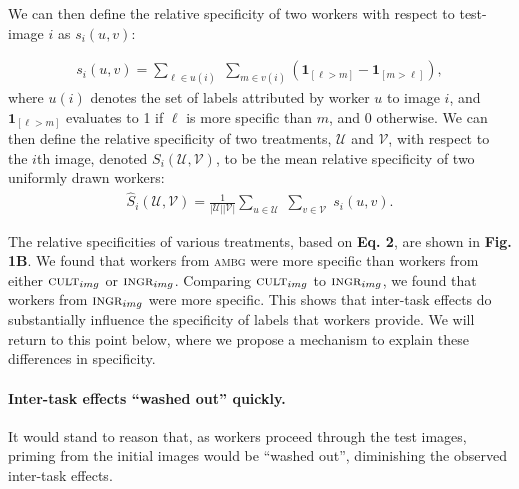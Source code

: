 \documentclass[letterpaper]{article}
\begin{document}
We can then define the relative specificity of two workers with respect to 
test-image $i$ as $s_i(u,v)$:

\begin{align}
	s_i(u,v) = \sum_{\ell \in u(i) } \;
	\sum_{m \in v(i)} 
	\left(\mathbf{1}_{[\ell > m]} - \mathbf{1}_{[m>\ell]}\right),
	\label{eq:worker-specificity}
\end{align}
where $u(i)$ denotes the set of labels attributed by worker $u$ to image $i$, 
and $\mathbf{1}_{[\ell > m]}$ evaluates to 1 if $\ell$ is more specific than 
$m$, and 0 otherwise.
We can then define the relative specificity of two treatments, $\mathcal{U}$ 
and $\mathcal{V}$, with respect to the $i$th image, denoted $S_i(\mathcal{U},\mathcal{V})$, 
to be the mean relative specificity of two uniformly drawn workers:  
\begin{align}
	\hat{S}_i(\mathcal{U},\mathcal{V}) = 
	\frac{1}{|\mathcal{U}| |\mathcal{V}|}
	\sum_{u \in \mathcal{U}} \;
	\sum_{v \in \mathcal{V}} \;
		s_i(u,v).
		\label{eq:specificity}
\end{align}

The relative specificities of various treatments, based on \textbf{Eq. 2},
are shown in \textbf{Fig. 1B}.  We found that workers 
from \textsc{ambg} were more specific than workers from
either $\textsc{cult}_{img}$ or $\textsc{ingr}_{img}$.  Comparing
$\textsc{cult}_{img}$ to $\textsc{ingr}_{img}$, we found that workers from
$\textsc{ingr}_{img}$ were more specific.  This shows that inter-task 
effects do substantially influence the specificity of labels that workers 
provide.  We will return to this point below, where we propose a mechanism to 
explain these differences in specificity. 

\paragraph{Inter-task effects ``washed out'' quickly.}  
It would stand to reason that, as workers proceed through the test images, 
priming from the initial images would be ``washed out'', diminishing the 
observed inter-task effects.
\end{document}
